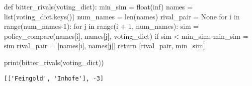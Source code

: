 \documentclass[
  letterpaper,
  DIV=11,
  numbers=noendperiod]{scrartcl}
\newenvironment{Shaded}{\begin{snugshade}}{\end{snugshade}}
\newcommand{\BuiltInTok}[1]{\textcolor[rgb]{0.00,0.23,0.31}{#1}}
\newcommand{\ControlFlowTok}[1]{\textcolor[rgb]{0.00,0.23,0.31}{#1}}
\newcommand{\DecValTok}[1]{\textcolor[rgb]{0.68,0.00,0.00}{#1}}
\newcommand{\KeywordTok}[1]{\textcolor[rgb]{0.00,0.23,0.31}{#1}}
\newcommand{\NormalTok}[1]{\textcolor[rgb]{0.00,0.23,0.31}{#1}}
\newcommand{\OperatorTok}[1]{\textcolor[rgb]{0.37,0.37,0.37}{#1}}
\newcommand{\StringTok}[1]{\textcolor[rgb]{0.13,0.47,0.30}{#1}}
\newcommand{\VariableTok}[1]{\textcolor[rgb]{0.07,0.07,0.07}{#1}}
\begin{document}
\begin{Shaded}
\begin{Highlighting}[numbers=left,,]
\KeywordTok{def}\NormalTok{ bitter\_rivals(voting\_dict):}
\NormalTok{    min\_sim }\OperatorTok{=} \BuiltInTok{float}\NormalTok{(}\StringTok{\textquotesingle{}inf\textquotesingle{}}\NormalTok{)}
\NormalTok{    names }\OperatorTok{=} \BuiltInTok{list}\NormalTok{(voting\_dict.keys())}
\NormalTok{    num\_names }\OperatorTok{=} \BuiltInTok{len}\NormalTok{(names)}
\NormalTok{    rival\_pair }\OperatorTok{=} \VariableTok{None}
    \ControlFlowTok{for}\NormalTok{ i }\KeywordTok{in} \BuiltInTok{range}\NormalTok{(num\_names}\OperatorTok{{-}}\DecValTok{1}\NormalTok{):}
        \ControlFlowTok{for}\NormalTok{ j }\KeywordTok{in} \BuiltInTok{range}\NormalTok{(i }\OperatorTok{+} \DecValTok{1}\NormalTok{, num\_names):}
\NormalTok{            sim }\OperatorTok{=}\NormalTok{ policy\_compare(names[i], names[j], voting\_dict)}
            \ControlFlowTok{if}\NormalTok{ sim }\OperatorTok{\textless{}}\NormalTok{ min\_sim:}
\NormalTok{                min\_sim }\OperatorTok{=}\NormalTok{ sim}
\NormalTok{                rival\_pair }\OperatorTok{=}\NormalTok{ [names[i], names[j]]}
    \ControlFlowTok{return}\NormalTok{ [rival\_pair, min\_sim]}

\BuiltInTok{print}\NormalTok{(bitter\_rivals(voting\_dict))}
\end{Highlighting}
\end{Shaded}

\begin{verbatim}
[['Feingold', 'Inhofe'], -3]
\end{verbatim}
\end{document}
